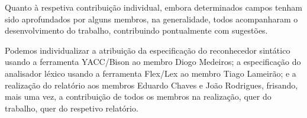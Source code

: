 \documentclass{report}
\begin{document}
Quanto à respetiva contribuição individual, embora determinados campos tenham sido aprofundados por alguns membros, na generalidade, todos acompanharam o desenvolvimento do trabalho, contribuindo pontualmente com sugestões. 

Podemos individualizar a atribuição da especificação do reconhecedor sintático usando a ferramenta YACC/Bison ao membro Diogo Medeiros; a especificação do analisador léxico usando a ferramenta Flex/Lex ao membro Tiago Lameirão; e a realização do relatório aos membros Eduardo Chaves e João Rodrigues, frisando, mais uma vez, a contribuição de todos os membros na realização, quer do trabalho, quer do respetivo relatório.



\end{document}
